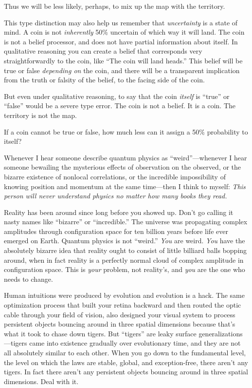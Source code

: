 {
 Thus we will be less likely, perhaps, to mix up the map with the
territory.}

{
 This type distinction may also help us remember that
\textit{uncertainty} is a state of mind. A coin is not
\textit{inherently} 50\% uncertain of which way it will land. The coin
is not a belief processor, and does not have partial information about
itself. In qualitative reasoning you can create a belief that
corresponds very straightforwardly to the coin, like
``The coin will land heads.'' This
belief will be true or false \textit{depending on} the coin, and there
will be a transparent implication from the truth or falsity of the
belief, to the facing side of the coin.}

{
 But even under qualitative reasoning, to say that the coin
\textit{itself} is ``true'' or
``false'' would be a severe type
error. The coin is not a belief. It is a coin. The territory is not the
map.}

{
 If a coin cannot be true or false, how much less can it assign a
50\% probability to itself?}

\myendsectiontext


{
 Whenever I hear someone describe quantum physics as
``weird''---whenever I hear someone
bewailing the mysterious effects of observation on the observed, or the
bizarre existence of nonlocal correlations, or the incredible
impossibility of knowing position and momentum at the same time---then
I think to myself: \textit{This person will never understand physics no
matter how many books they read.} }

{
 Reality has been around since long before you showed up.
Don't go calling it nasty names like
``bizarre'' or
``incredible.'' The universe was
propagating complex amplitudes through configuration space for ten
billion years before life ever emerged on Earth. Quantum physics is not
``weird.'' \textit{You} are weird.
\textit{You} have the absolutely bizarre idea that reality ought to
consist of little billiard balls bopping around, when in fact reality
is a perfectly normal cloud of complex amplitude in configuration
space. This is \textit{your} problem, not reality's,
and \textit{you} are the one who needs to change.}

{
 Human intuitions were produced by evolution and evolution is a
hack. The same optimization process that built your retina backward and
then routed the optic cable through your field of vision, also designed
your visual system to process persistent objects bouncing around in
three spatial dimensions because that's what it took to
chase down tigers. But ``tigers''
are leaky surface generalizations---tigers came into existence
gradually over evolutionary time, and they are not all absolutely
similar to each other. When you go down to the fundamental level, the
level on which the laws are stable, global, and exception-free, there
aren't any tigers. In fact there aren't
any persistent objects bouncing around in three spatial dimensions.
Deal with it.}

